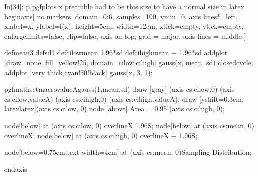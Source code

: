 \documentclass[float=false,crop=false]{standalone}
\begin{document}
\begin{InVerbatim}[commandchars=\\\{\},fontsize=\scriptsize]
{\color{incolor}In[{\color{incolor}34}]:}  \PYZhy{}p pgfplots \PYZhy{}x \PYZdl{}preamble
         \PYZpc{} had to be this size to have a normal size in latex
             \PYZbs{}begin\PYZob{}axis\PYZcb{}[
                 no markers,
                 domain=0:6,
                 samples=100,
                 ymin=0,
                 axis lines*=left,
                 xlabel=\PYZdl{}x\PYZdl{},
                 ylabel=\PYZdl{}f(x)\PYZdl{},
                 height=5cm,
                 width=12cm,
                 xtick=\PYZbs{}empty,
                 ytick=\PYZbs{}empty,
                 enlargelimits=false,
                 clip=false,
                 axis on top,
                 grid = major,
                 axis lines = middle
               ]
         
             \PYZbs{}def\PYZbs{}mean\PYZob{}3\PYZcb{}
             \PYZbs{}def\PYZbs{}sd\PYZob{}1\PYZcb{}
             \PYZbs{}def\PYZbs{}cilow\PYZob{}\PYZbs{}mean \PYZhy{} 1.96*\PYZbs{}sd\PYZcb{}
             \PYZbs{}def\PYZbs{}cihigh\PYZob{}\PYZbs{}mean + 1.96*\PYZbs{}sd\PYZcb{}
             \PYZbs{}addplot [draw=none, fill=yellow!25, domain=\PYZbs{}cilow:\PYZbs{}cihigh] \PYZob{}gauss(x, \PYZbs{}mean, \PYZbs{}sd)\PYZcb{}
         \PYZbs{}closedcycle;
             \PYZbs{}addplot [very thick,cyan!50!black] \PYZob{}gauss(x, 3, 1)\PYZcb{};
         
             \PYZbs{}pgfmathsetmacro\PYZbs{}valueA\PYZob{}gauss(1,\PYZbs{}mean,\PYZbs{}sd)\PYZcb{}
             \PYZbs{}draw [gray] (axis cs:\PYZbs{}cilow,0) \PYZhy{}\PYZhy{} (axis cs:\PYZbs{}cilow,\PYZbs{}valueA) (axis cs:\PYZbs{}cihigh,0) \PYZhy{}\PYZhy{}
         (axis cs:\PYZbs{}cihigh,\PYZbs{}valueA);
             \PYZbs{}draw [yshift=0.3cm, latex\PYZhy{}latex](axis cs:\PYZbs{}cilow, 0) \PYZhy{}\PYZhy{} node [above] \PYZob{}Area = \PYZdl{}0.95\PYZdl{}\PYZcb{}
         (axis cs:\PYZbs{}cihigh, 0);
         
             \PYZbs{}node[below] at (axis cs:\PYZbs{}cilow, 0)  \PYZob{}\PYZdl{}\PYZbs{}overline\PYZob{}X\PYZcb{} \PYZhy{} 1.96S\PYZdl{}\PYZcb{};
             \PYZbs{}node[below] at (axis cs:\PYZbs{}mean, 0)  \PYZob{}\PYZdl{}\PYZbs{}overline\PYZob{}X\PYZcb{}\PYZdl{}\PYZcb{};
             \PYZbs{}node[below] at (axis cs:\PYZbs{}cihigh, 0)  \PYZob{}\PYZdl{}\PYZbs{}overline\PYZob{}X\PYZcb{} + 1.96S\PYZdl{}\PYZcb{};
         
             \PYZbs{}node[below=0.75cm,text width=4cm] at (axis cs:\PYZbs{}mean, 0)\PYZob{}Sampling Distribution\PYZcb{};
         
         \PYZbs{}end\PYZob{}axis\PYZcb{}
\end{InVerbatim}
    \begin{center}
    \end{center}
    { \hspace*{\fill} \\}
    
\end{document}
